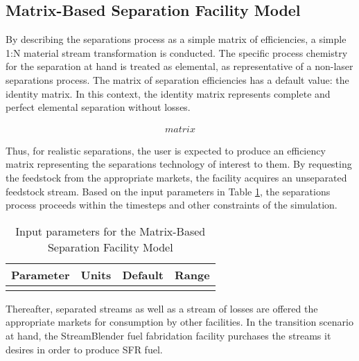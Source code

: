 \subsection{Matrix-Based Separation Facility Model}

By describing the separations process as a simple matrix of efficiencies, a 
simple 1:N material stream transformation is conducted. The specific process 
chemistry for the separation at hand is treated as elemental, as representative 
of a non-laser separations process. The matrix of separation efficiencies has a 
default value: the identity matrix. In this context, the identity matrix 
represents complete and perfect elemental separation without losses. 

\begin{align}
matrix
\label{defaultsep}
\end{align}

Thus, for realistic separations, the user is expected to produce an efficiency 
matrix representing the separations technology of interest to them. 
By requesting the feedstock from the 
appropriate markets, the facility acquires an unseparated feedstock stream. 
Based on the input parameters  in Table \ref{tab:sepmatrix}, the separations 
process proceeds within the timesteps and other constraints of the simulation. 


\begin{table}[h!]
\centering
\begin{tabular}{|l|r|r|r|}
\hline
\textbf{Parameter} & \textbf{Units} & \textbf{Default} & \textbf{Range}\\ 
\hline
& & & \\
\hline
\end{tabular}
\caption{Input parameters for the Matrix-Based Separation Facility Model}
\label{tab:sepmatrix}
\end{table}

Thereafter, separated streams as well as a stream of losses are offered the 
appropriate markets for consumption by other facilities. In the transition 
scenario at hand, the StreamBlender fuel fabridation facility purchases the 
streams it desires in order to produce SFR fuel. 
